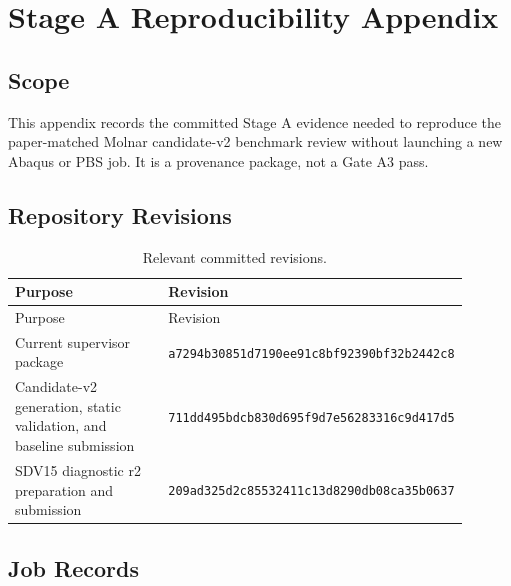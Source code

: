 \appendix
\chapter{Stage A Reproducibility Appendix}

\section{Scope}

This appendix records the committed Stage A evidence needed to reproduce the
paper-matched Molnar candidate-v2 benchmark review without launching a new
Abaqus or PBS job. It is a provenance package, not a Gate A3 pass.

\section{Repository Revisions}

\begin{longtable}{p{0.34\linewidth}p{0.56\linewidth}}
\caption{Relevant committed revisions.}\\
\toprule
Purpose & Revision \\
\midrule
\endfirsthead
\toprule
Purpose & Revision \\
\midrule
\endhead
Current supervisor package & \texttt{a7294b30851d7190ee91c8bf92390bf32b2442c8} \\
Candidate-v2 generation, static validation, and baseline submission & \texttt{711dd495bdcb830d695f9d7e56283316c9d417d5} \\
SDV15 diagnostic r2 preparation and submission & \texttt{209ad325d2c85532411c13d8290db08ca35b0637} \\
\bottomrule
\end{longtable}

\section{Job Records}

